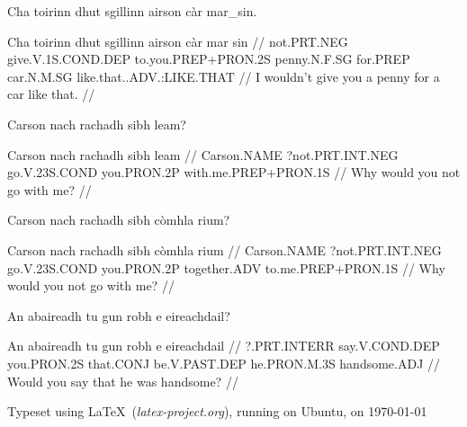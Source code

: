 \documentclass[a4paper,10pt]{article}
\begin{document}
\ex
\begingl
\glpre Cha toirinn dhut sgillinn airson càr mar\_sin. 

\vspace{4mm}
\gla Cha toirinn dhut sgillinn airson càr {mar sin}  //
\glb not.PRT.NEG give.V.1S.COND.DEP to.you.PREP+PRON.2S penny.N.F.SG for.PREP car.N.M.SG like.that..ADV.:LIKE.THAT  //
\glft I wouldn't give you a penny for a car like that. //
\endgl
\xe

\ex
\begingl
\glpre Carson nach rachadh sibh leam? 

\vspace{4mm}
\gla Carson nach rachadh sibh leam  //
\glb Carson.NAME ?not.PRT.INT.NEG go.V.23S.COND you.PRON.2P with.me.PREP+PRON.1S  //
\glft Why would you not go with me? //
\endgl
\xe

\ex
\begingl
\glpre Carson nach rachadh sibh còmhla rium? 

\vspace{4mm}
\gla Carson nach rachadh sibh còmhla rium  //
\glb Carson.NAME ?not.PRT.INT.NEG go.V.23S.COND you.PRON.2P together.ADV to.me.PREP+PRON.1S  //
\glft Why would you not go with me? //
\endgl
\xe

\ex
\begingl
\glpre An abaireadh tu gun robh e eireachdail? 

\vspace{4mm}
\gla An abaireadh tu gun robh e eireachdail  //
\glb ?.PRT.INTERR say.V.COND.DEP you.PRON.2S that.CONJ be.V.PAST.DEP he.PRON.M.3S handsome.ADJ  //
\glft Would you say that he was handsome? //
\endgl
\xe


\vfill

\begin{flushright}
Typeset using \LaTeX\ (\textit{latex-project.org}), running on Ubuntu, on \longdate\today
\end{flushright}
\end{document}
